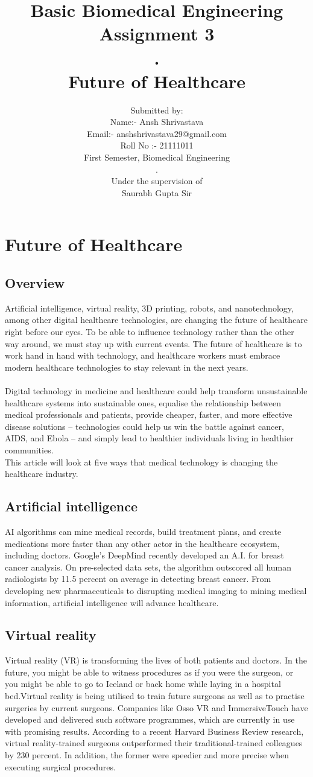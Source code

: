 \documentclass[12pt]{article}
\title{Basic Biomedical Engineering\\Assignment 3\\.\\Future of Healthcare}
\author{Submitted by: \\Name:- Ansh Shrivastava\\Email:- anshshrivastava29@gmail.com\\Roll No :- 21111011\\First Semester, Biomedical Engineering\\.\\Under the supervision of\\Saurabh Gupta Sir}
\begin{document}
\maketitle
\clearpage
\tableofcontents
\clearpage

\section{Future of Healthcare}
\subsection{Overview}
Artificial intelligence, virtual reality, 3D printing, robots, and nanotechnology, among other digital healthcare technologies, are changing the future of healthcare right before our eyes. To be able to influence technology rather than the other way around, we must stay up with current events. The future of healthcare is to work hand in hand with technology, and healthcare workers must embrace modern healthcare technologies to stay relevant in the next years.
\\
\\
Digital technology in medicine and healthcare could help transform unsustainable healthcare systems into sustainable ones, equalise the relationship between medical professionals and patients, provide cheaper, faster, and more effective disease solutions – technologies could help us win the battle against cancer, AIDS, and Ebola – and simply lead to healthier individuals living in healthier communities.
\\
This article will look at five ways that medical technology is changing the healthcare industry.
\subsection{Artificial intelligence}
AI algorithms can mine medical records, build treatment plans, and create medications more faster than any other actor in the healthcare ecosystem, including doctors. Google's DeepMind recently developed an A.I. for breast cancer analysis. On pre-selected data sets, the algorithm outscored all human radiologists by 11.5 percent on average in detecting breast cancer. From developing new pharmaceuticals to disrupting medical imaging to mining medical information, artificial intelligence will advance healthcare.
\subsection{Virtual reality}
Virtual reality (VR) is transforming the lives of both patients and doctors. In the future, you might be able to witness procedures as if you were the surgeon, or you might be able to go to Iceland or back home while laying in a hospital bed.Virtual reality is being utilised to train future surgeons as well as to practise surgeries by current surgeons. Companies like Osso VR and ImmersiveTouch have developed and delivered such software programmes, which are currently in use with promising results. According to a recent Harvard Business Review research, virtual reality-trained surgeons outperformed their traditional-trained colleagues by 230 percent. In addition, the former were speedier and more precise when executing surgical procedures.
\end{document}
